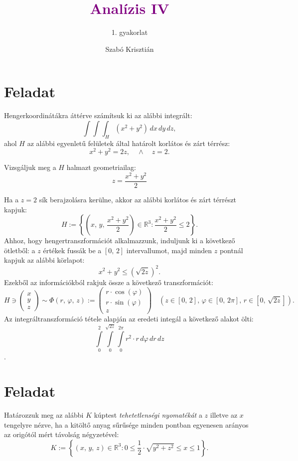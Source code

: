\documentclass[12pt]{article}
\title{\textcolor{purple}{\Huge\textbf{Analízis IV}}}
\author{1. gyakorlat}
\date{Szabó Krisztián}
\newcommand{\R}{\mathbb{R}}
\begin{document}
    \maketitle
    \tableofcontents
    \newpage
    \section{Feladat}
    Hengerkoordinátákra áttérve számítsuk ki az alábbi integrált:
    \[
        \int\int\int_H (x^2 + y^2) \, dx \, dy \, dz,
    \]
    ahol $H$ az alábbi egyenletű felületek által határolt korlátos és zárt térrész:
    \[
        x^2 + y^2 = 2z, \quad \wedge \quad z = 2.
    \]

    Vizsgáljuk meg a $H$ halmazt geometriailag:
    \[
        z = \frac{x^2 + y^2}{2}
    \]

    Ha a $z = 2$ sík berajzolásra kerülne, akkor az alábbi korlátos és zárt térrészt kapjuk:
    \[
        H := \left\{ \left(x, \, y, \, \frac{x^2 + y^2}{2} \right) \in \R^3 : \frac{x^2 + y^2}{2} \leq 2 \right\}.
    \]
    Ahhoz, hogy hengertranszformációt alkalmazzunk, induljunk ki a következő ötletből: a $z$ értékek fussák be a $[0, \, 2]$ intervallumot, majd minden $z$ pontnál kapjuk az alábbi körlapot:
    \[
        x^2 + y^2 \leq \left( \sqrt{2z} \right)^2.
    \]
    Ezekből az információkból rakjuk össze a következő transzformációt:
    \[
        H \ni    
        \begin{pmatrix}
            x \\
            y \\
            z
        \end{pmatrix}
        \sim
        \Phi(r, \, \varphi, \, z) :=
        \begin{pmatrix}
            r \cdot \cos(\varphi) \\
            r \cdot \sin(\varphi) \\
            z
        \end{pmatrix}
        \quad \left(z \in [0, \, 2], \, \varphi \in [0, \, 2\pi], \, r \in [0, \, \sqrt{2z}]\right).
    \]
    Az integráltranszformáció tétele alapján az eredeti integál a következő alakot ölti:
    \[
        \int\limits_0^2 \int\limits_0^{\sqrt{2z}} \int\limits_0^{2\pi} r^2 \cdot r \, d\varphi \, dr \, dz
    \].

    \newpage
    \section{Feladat}
    Határozzuk meg az alábbi $K$ kúptest \textit{tehetetlenségi nyomatékát} a $z$ illetve az $x$ tengelyre nézve, ha a kitöltő anyag sűrűsége minden pontban egyenesen arányos az origótól mért távolság négyzetével:
    \[
        K := \left\{ (x, \, y, \, z) \in \R^3 : 0 \leq \frac{1}{2} \cdot \sqrt{y^2 + z^2} \leq x \leq 1 \right\}.
    \]
    
\end{document}
